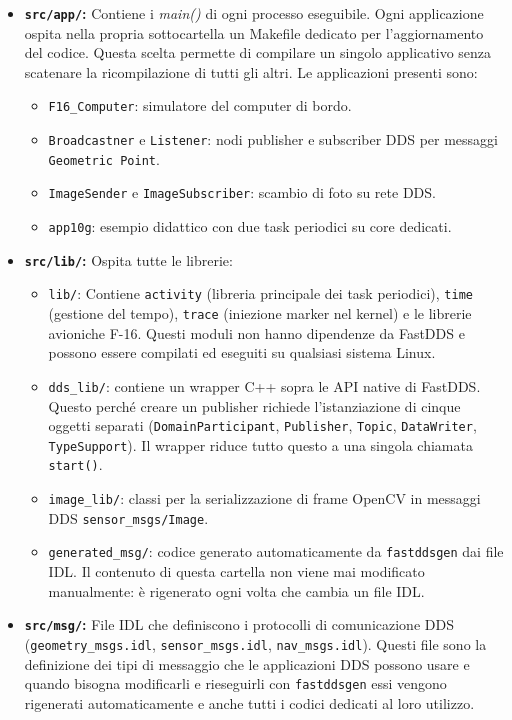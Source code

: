 \begin{itemize}
	\item \textbf{\texttt{src/app/}:} Contiene i \textit{main()} di ogni processo eseguibile. Ogni applicazione ospita nella propria sottocartella un Makefile dedicato per l'aggiornamento del codice. Questa scelta permette di compilare un singolo applicativo senza scatenare la ricompilazione di tutti gli altri. Le applicazioni presenti sono:
	\begin{itemize}
		\item \texttt{F16\_Computer}: simulatore del computer di bordo.
		\item \texttt{Broadcastner} e \texttt{Listener}: nodi publisher e subscriber DDS per messaggi  \texttt{Geometric Point}.
		\item \texttt{ImageSender} e \texttt{ImageSubscriber}: scambio di foto su rete DDS.
		\item \texttt{app10g}: esempio didattico con due task periodici su core dedicati.
	\end{itemize}
	
	\item \textbf{\texttt{src/lib/}:} Ospita tutte le librerie:
	\begin{itemize}
		\item \texttt{lib/}: Contiene \texttt{activity} (libreria principale dei task periodici), \texttt{time} (gestione del tempo), \texttt{trace} (iniezione marker nel kernel) e le librerie avioniche F-16. Questi moduli non hanno dipendenze da FastDDS e possono essere compilati ed eseguiti su qualsiasi sistema Linux.
		\item \texttt{dds\_lib/}: contiene un wrapper C++ sopra le API native di FastDDS. Questo perché creare un publisher richiede l'istanziazione di cinque oggetti separati (\texttt{DomainParticipant}, \texttt{Publisher}, \texttt{Topic}, \texttt{DataWriter}, \texttt{TypeSupport}). Il wrapper riduce tutto questo a una singola chiamata \texttt{start()}.
		\item \texttt{image\_lib/}: classi per la serializzazione di frame OpenCV in messaggi DDS \texttt{sensor\_msgs/Image}.
		\item \texttt{generated\_msg/}: codice generato automaticamente da \texttt{fastddsgen} dai file IDL. Il contenuto di questa cartella non viene mai modificato manualmente: è rigenerato ogni volta che cambia un file IDL.
	\end{itemize}
	
	\item \textbf{\texttt{src/msg/}:} File IDL che definiscono i protocolli di comunicazione DDS (\texttt{geometry\_msgs.idl}, \texttt{sensor\_msgs.idl}, \texttt{nav\_msgs.idl}). Questi file sono la definizione dei tipi di messaggio che le applicazioni DDS possono usare e quando bisogna modificarli e rieseguirli con \texttt{fastddsgen} essi  vengono rigenerati automaticamente e anche tutti i codici dedicati al loro utilizzo.
	

\end{itemize}
